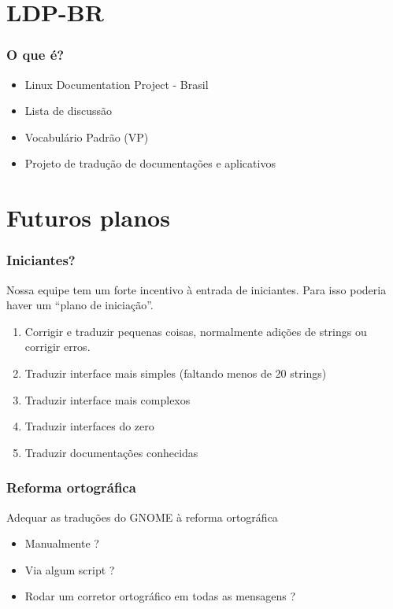 \documentclass{beamer}
\begin{document}
\section{LDP-BR}

\begin{frame}
  \frametitle{O que é?}
  \begin{itemize}[<+->]
    \item Linux Documentation Project - Brasil
    \item Lista de discussão
    \item Vocabulário Padrão (VP)
    \item Projeto de tradução de documentações e aplicativos
  \end{itemize}
\end{frame}

\section{Futuros planos}

\begin{frame}
    \frametitle{Iniciantes?}
    Nossa equipe tem um forte incentivo à entrada de iniciantes. Para isso poderia haver um ``plano de iniciação''.
    \begin{enumerate}
        \item Corrigir e traduzir pequenas coisas, normalmente adições de strings ou corrigir erros. 
        \item Traduzir interface mais simples (faltando menos de 20 strings)
        \item Traduzir interface mais complexos 
        \item Traduzir interfaces do zero
        \item Traduzir documentações conhecidas
    \end{enumerate}
\end{frame}

\begin{frame}
    \frametitle{Reforma ortográfica}

    Adequar as traduções do GNOME à reforma ortográfica
    \begin{itemize}[<+->]
        \item Manualmente ? 
        \item Via algum script ?
        \item Rodar um corretor ortográfico em todas as mensagens ?  
    \end{itemize}
\end{frame}
\end{document}

